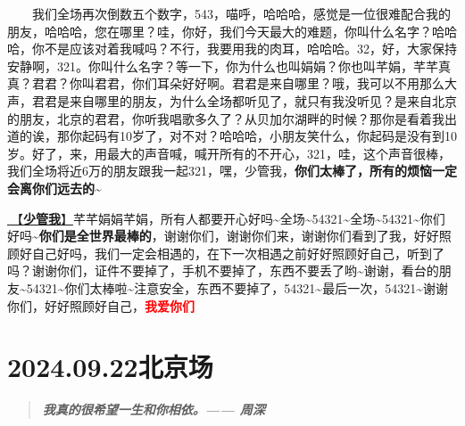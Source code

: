 \documentclass[]{ctexbook}
\begin{document}
  我们全场再次倒数五个数字，543，喵呼，哈哈哈，感觉是一位很难配合我的朋友，哈哈哈，您在哪里？哇，你好，我们今天最大的难题，你叫什么名字？哈哈哈，你不是应该对着我喊吗？不行，我要用我的肉耳，哈哈哈。32，好，大家保持安静啊，321。你叫什么名字？等一下，你为什么也叫娟娟？你也叫芊娟，芊芊真真？君君？你叫君君，你们耳朵好好啊。君君是来自哪里？哦，我可以不用那么大声，君君是来自哪里的朋友，为什么全场都听见了，就只有我没听见？是来自北京的朋友，北京的君君，你听我唱歌多久了？从贝加尔湖畔的时候？那你是看着我出道的诶，那你起码有10岁了，对不对？哈哈哈，小朋友笑什么，你起码是没有到10岁。好了，来，用最大的声音喊，喊开所有的不开心，321，哇，这个声音很棒，我们全场将近6万的朋友跟我一起321，嘿，少管我，\textbf{你们太棒了，所有的烦恼一定会离你们远去的\textasciitilde{}}

\hyperref[watch-ur-manners]{🎵【\textbf{少管我}】}芊芊娟娟芊娟，所有人都要开心好吗\textasciitilde 全场\textasciitilde54321\textasciitilde 全场\textasciitilde54321\textasciitilde 你们好吗\textasciitilde{}\textbf{你们是全世界最棒的}，谢谢你们，谢谢你们来，谢谢你们看到了我，好好照顾好自己好吗，我们一定会相遇的，在下一次相遇之前好好照顾好自己，听到了吗？谢谢你们，证件不要掉了，手机不要掉了，东西不要丢了哟\textasciitilde 谢谢，看台的朋友\textasciitilde54321\textasciitilde 你们太棒啦\textasciitilde 注意安全，东西不要掉了，54321\textasciitilde 最后一次，54321\textasciitilde 谢谢你们，好好照顾好自己，\textbf{\textcolor{red}{我爱你们~} }

\chapter{2024.09.22北京场}\label{beijing-20240922}

\begin{quote}
\textbf{\emph{我真的很希望一生和你相依。------ 周深}}
\end{quote}
\end{document}
